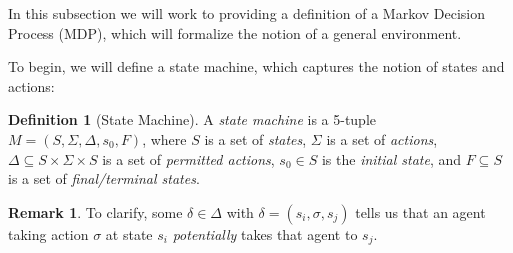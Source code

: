 \documentclass[12pt,oneside,oldfontcommands]{memoir}
\theoremstyle{definition}
\newtheorem{defn}{Definition}
\newtheorem{remark}{Remark}
\renewcommand{\d}{\delta}
\newcommand{\s}{\sigma}
\begin{document}
\begin{Subsection}
In this subsection we will work to providing a definition of a Markov Decision Process (MDP), which will formalize the notion of a general environment.

\tcblower 

\tcblower
To begin, we will define a state machine, which captures the notion of states and actions:
\begin{defn}[State Machine]
A \textit{state machine} is a 5-tuple $M = (S, \Sigma, \Delta, s_0, F)$, where $S$ is a set of \textit{states}, $\Sigma$ is a set of \textit{actions}, $\Delta \subseteq S \times \Sigma \times S$ is a set of \textit{permitted actions}, $s_0 \in S$ is the \textit{initial state}, and $F \subseteq S$ is a set of \textit{final/terminal states}. 
\end{defn}

\begin{remark}
To clarify, some $\d \in \Delta$ with $\d = (s_i, \s, s_j)$ tells us that an agent taking action $\s$ at state $s_i$ \textit{potentially} takes that agent to $s_j$. 
\end{remark}


\end{Subsection}
\end{document}
